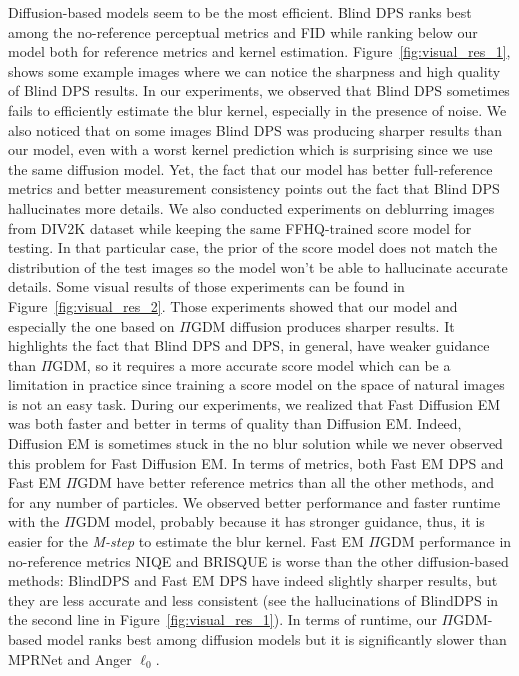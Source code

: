 \documentclass[10pt,twocolumn,letterpaper]{article}
\begin{document}
Diffusion-based models seem to be the most efficient. Blind DPS ranks best among the no-reference perceptual metrics and FID while ranking below our model both for reference metrics and kernel estimation. Figure~\ref{fig:visual_res_1}, shows some example images where we can notice the sharpness and high quality of Blind DPS results. In our experiments, we observed that Blind DPS sometimes fails to efficiently estimate the blur kernel, especially in the presence of noise. We also noticed that on some images Blind DPS was producing sharper results than our model, even with a worst kernel prediction which is surprising since we use the same diffusion model. Yet, the fact that our model has better full-reference metrics and better measurement consistency points out the fact that Blind DPS hallucinates more details. We also conducted experiments on deblurring images from DIV2K dataset while keeping the same FFHQ-trained score model for testing. In that particular case, the prior of the score model does not match the distribution of the test images so the model won’t be able to hallucinate accurate details. Some visual results of those experiments can be found in Figure~\ref{fig:visual_res_2}. Those experiments showed that our model and especially the one based on $\Pi$GDM diffusion produces sharper results. It highlights the fact that
Blind DPS and DPS, in general, have weaker guidance than $\Pi$GDM, so it requires a more accurate score model which can be a limitation in practice since training a score model on the space of natural images is not an easy task.
%
During our experiments, we realized that Fast Diffusion EM was both faster and better in terms of quality than Diffusion EM. Indeed, Diffusion EM is sometimes stuck in the no blur solution while we never observed this problem for Fast Diffusion EM. %
In terms of metrics, both Fast EM DPS and Fast EM $\Pi$GDM have better reference metrics than all the other methods, and for any number of particles. We observed better performance and faster runtime with the $\Pi$GDM model, probably because it has stronger guidance, thus, it is easier for the \textit{M-step} to estimate the blur kernel. Fast EM $\Pi$GDM performance in no-reference metrics NIQE and BRISQUE is worse than the other diffusion-based methods: BlindDPS and Fast EM DPS have indeed slightly sharper results, but they are less accurate and less consistent (see the hallucinations of BlindDPS in the second line in Figure~\ref{fig:visual_res_1}).
%
%
In terms of runtime, our $\Pi$GDM-based model ranks best among diffusion models but it is significantly slower than MPRNet and Anger $\ell_0$.
\end{document}
